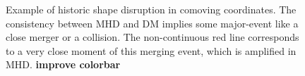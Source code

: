 \begin{figure}[!ht]
  \centering
  \hfill
  \caption{Example of historic shape disruption in comoving coordinates. The consistency between MHD and DM implies some major-event like a close merger or a collision. The non-continuous red line corresponds to a very close moment of this merging event, which is amplified in MHD.  \textbf{improve colorbar}}
\end{figure}

